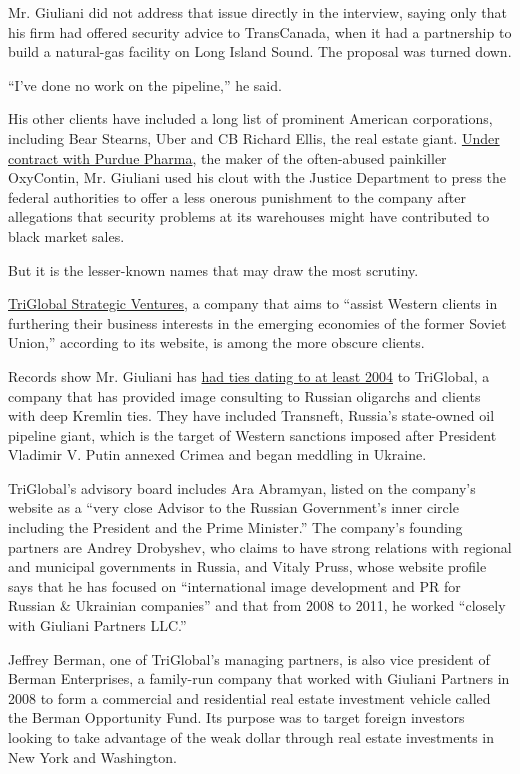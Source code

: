 Mr. Giuliani did not address that issue directly in the interview,
saying only that his firm had offered security advice to TransCanada,
when it had a partnership to build a natural-gas facility on Long Island
Sound. The proposal was turned down.

``I've done no work on the pipeline,'' he said.

His other clients have included a long list of prominent American
corporations, including Bear Stearns, Uber and CB Richard Ellis, the
real estate giant.
\href{http://www.nytimes3xbfgragh.onion/2007/12/28/us/politics/28oxycontin.html}{Under
contract with Purdue Pharma}, the maker of the often-abused painkiller
OxyContin, Mr. Giuliani used his clout with the Justice Department to
press the federal authorities to offer a less onerous punishment to the
company after allegations that security problems at its warehouses might
have contributed to black market sales.

But it is the lesser-known names that may draw the most scrutiny.

\href{http://www.tgsv.net/}{TriGlobal Strategic Ventures}, a company
that aims to ``assist Western clients in furthering their business
interests in the emerging economies of the former Soviet Union,''
according to its website, is among the more obscure clients.

Records show Mr. Giuliani has
\href{http://www.tgsv.net/management/management-team}{had ties dating to
at least 2004} to TriGlobal, a company that has provided image
consulting to Russian oligarchs and clients with deep Kremlin ties. They
have included Transneft, Russia's state-owned oil pipeline giant, which
is the target of Western sanctions imposed after President Vladimir V.
Putin annexed Crimea and began meddling in Ukraine.

TriGlobal's advisory board includes Ara Abramyan, listed on the
company's website as a ``very close Advisor to the Russian Government's
inner circle including the President and the Prime Minister.'' The
company's founding partners are Andrey Drobyshev, who claims to have
strong relations with regional and municipal governments in Russia, and
Vitaly Pruss, whose website profile says that he has focused on
``international image development and PR for Russian \& Ukrainian
companies'' and that from 2008 to 2011, he worked ``closely with
Giuliani Partners LLC.''

Jeffrey Berman, one of TriGlobal's managing partners, is also vice
president of Berman Enterprises, a family-run company that worked with
Giuliani Partners in 2008 to form a commercial and residential real
estate investment vehicle called the Berman Opportunity Fund. Its
purpose was to target foreign investors looking to take advantage of the
weak dollar through real estate investments in New York and Washington.

